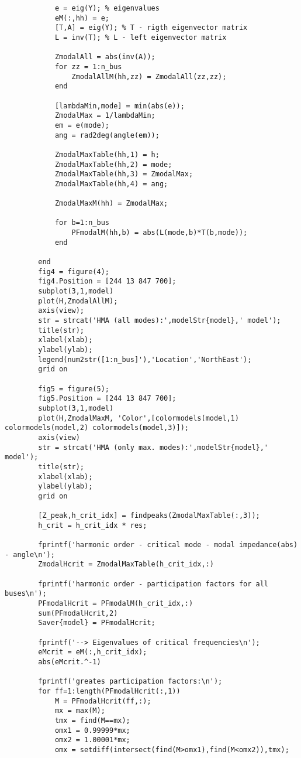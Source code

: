 \begin{appendices}
\begin{lstlisting}
            e = eig(Y); % eigenvalues
            eM(:,hh) = e; 
            [T,A] = eig(Y); % T - rigth eigenvector matrix
            L = inv(T); % L - left eigenvector matrix

            ZmodalAll = abs(inv(A));
            for zz = 1:n_bus
                ZmodalAllM(hh,zz) = ZmodalAll(zz,zz);
            end    

            [lambdaMin,mode] = min(abs(e));
            ZmodalMax = 1/lambdaMin;
            em = e(mode);
            ang = rad2deg(angle(em));

            ZmodalMaxTable(hh,1) = h;
            ZmodalMaxTable(hh,2) = mode;
            ZmodalMaxTable(hh,3) = ZmodalMax;
            ZmodalMaxTable(hh,4) = ang;

            ZmodalMaxM(hh) = ZmodalMax;
            
            for b=1:n_bus
                PFmodalM(hh,b) = abs(L(mode,b)*T(b,mode));
            end

        end
        fig4 = figure(4);
        fig4.Position = [244 13 847 700];
        subplot(3,1,model)
        plot(H,ZmodalAllM);
        axis(view);
        str = strcat('HMA (all modes):',modelStr{model},' model');
        title(str);
        xlabel(xlab);
        ylabel(ylab);
        legend(num2str([1:n_bus]'),'Location','NorthEast');
        grid on

        fig5 = figure(5);
        fig5.Position = [244 13 847 700];
        subplot(3,1,model)
        plot(H,ZmodalMaxM, 'Color',[colormodels(model,1) colormodels(model,2) colormodels(model,3)]);
        axis(view)
        str = strcat('HMA (only max. modes):',modelStr{model},' model');
        title(str);
        xlabel(xlab);
        ylabel(ylab);
        grid on

        [Z_peak,h_crit_idx] = findpeaks(ZmodalMaxTable(:,3));
        h_crit = h_crit_idx * res;

        fprintf('harmonic order - critical mode - modal impedance(abs) - angle\n');
        ZmodalHcrit = ZmodalMaxTable(h_crit_idx,:)

        fprintf('harmonic order - participation factors for all buses\n');
        PFmodalHcrit = PFmodalM(h_crit_idx,:)
        sum(PFmodalHcrit,2)
        Saver{model} = PFmodalHcrit;

        fprintf('--> Eigenvalues of critical frequencies\n');
        eMcrit = eM(:,h_crit_idx);
        abs(eMcrit.^-1)
        
        fprintf('greates participation factors:\n');
        for ff=1:length(PFmodalHcrit(:,1))
            M = PFmodalHcrit(ff,:);
            mx = max(M);
            tmx = find(M==mx);
            omx1 = 0.99999*mx;
            omx2 = 1.00001*mx;
            omx = setdiff(intersect(find(M>omx1),find(M<omx2)),tmx);


\end{lstlisting}
\end{appendices}
